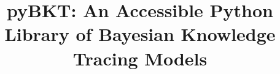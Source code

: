 \documentclass{edm_article}
\begin{document}
\title{pyBKT: An Accessible Python Library of Bayesian Knowledge Tracing Models}
%

%
%
%
%
\end{document}
